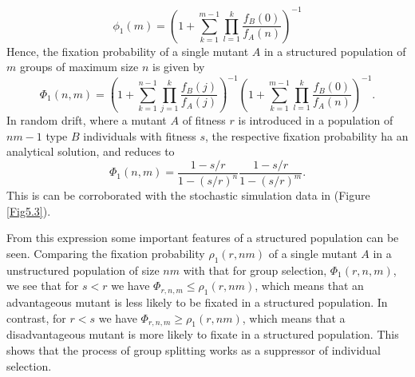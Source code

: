 \begin{equation}\label{5.37}
\phi_{1}(m)=\left(1+ \sum\limits_{k=1}^{m-1}\prod\limits_{l=1}^{k}\frac{f_{B}(0)}{f_{A}(n)}\right)^{-1}
\end{equation} 
Hence, the fixation probability of a single mutant $A$ in a structured population of $m$ groups of maximum size $n$ is given by
\begin{equation}
\Phi_1(n,m)=\left(1+\sum\limits_{k=1}^{n-1}\prod\limits_{j=1}^{k}\frac{f_{B}(j)}{f_{A}(j)}\right)^{-1}\left(1+ \sum\limits_{k=1}^{m-1}\prod\limits_{l=1}^{k}\frac{f_{B}(0)}{f_{A}(n)}\right)^{-1}.
\end{equation} 
In random drift, where a mutant $A$ of fitness $r$ is introduced in a population of $nm-1$ type $B$ individuals with fitness $s$, the respective fixation probability ha an analytical solution, and reduces to   
\begin{equation}
\Phi_1(n,m)=\frac{1-s/r}{1-(s/r)^{n}}\frac{1-s/r}{1-(s/r)^{m}}.
\end{equation}
This is can be corroborated with the stochastic simulation data in (Figure \ref{Fig5.3}).

From this expression  some important features of a structured population can be seen\cite{Traulsen2005}. Comparing the fixation probability $\rho_{1}(r,nm)$ of a single mutant $A$ in a unstructured population of size $nm$ with that for group selection, $\Phi_{1}(r,n,m)$, we see that  for $s<r$ we have $\Phi_{r,n,m}\leqslant \rho_1(r,nm)$, which means that an advantageous mutant is  less likely to be fixated in a structured population. In contrast, for $r<s$ we have $\Phi_{r,n,m}\geqslant \rho_1(r,nm)$, which means that a disadvantageous mutant is more likely to fixate in a structured population. This  shows that the process of group splitting works as a suppressor of individual selection.
 
